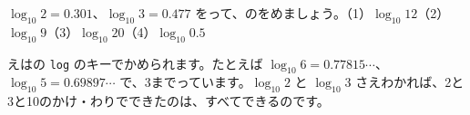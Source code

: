 \begin{jibun}
$\log_{10}2=0.301$、$\log_{10}3=0.477$ をって、のをめましょう。（1）\nobreak $\log_{10}12$\quad（2）\nobreak $\log_{10}9$\quad（3）\nobreak $\log_{10}20$\quad（4）\nobreak $\log_{10}0.5$
\end{jibun}
\noindent {}えはの \texttt{log} のキーでかめられます。たとえば $\log_{10}6=0.77815\cdots$、$\log_{10}5=0.69897\cdots$ で、3までっています。$\log_{10}2$ と $\log_{10}3$ さえわかれば、2と3と10のかけ・わりでできたのは、すべてできるのです。

